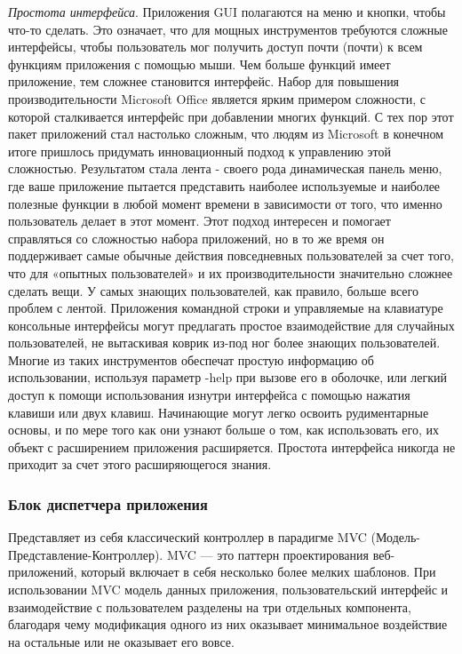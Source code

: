\textit{Простота интерфейса}. Приложения GUI полагаются на меню и кнопки, чтобы что-то сделать. Это означает, что для мощных инструментов требуются сложные интерфейсы, чтобы пользователь мог получить доступ почти (почти) к всем функциям приложения с помощью мыши. Чем больше функций имеет приложение, тем сложнее становится интерфейс. Набор для повышения производительности Microsoft Office является ярким примером сложности, с которой сталкивается интерфейс при добавлении многих функций. С тех пор этот пакет приложений стал настолько сложным, что людям из Microsoft в конечном итоге пришлось придумать инновационный подход к управлению этой сложностью. Результатом стала лента - своего рода динамическая панель меню, где ваше приложение пытается представить наиболее используемые и наиболее полезные функции в любой момент времени в зависимости от того, что именно пользователь делает в этот момент. Этот подход интересен и помогает справляться со сложностью набора приложений, но в то же время он поддерживает самые обычные действия повседневных пользователей за счет того, что для «опытных пользователей» и их производительности значительно сложнее сделать вещи. У самых знающих пользователей, как правило, больше всего проблем с лентой. Приложения командной строки и управляемые на клавиатуре консольные интерфейсы могут предлагать простое взаимодействие для случайных пользователей, не вытаскивая коврик из-под ног более знающих пользователей. Многие из таких инструментов обеспечат простую информацию об использовании, используя параметр -help при вызове его в оболочке, или легкий доступ к помощи использования изнутри интерфейса с помощью нажатия клавиши или двух клавиш. Начинающие могут легко освоить рудиментарные основы, и по мере того как они узнают больше о том, как использовать его, их объект с расширением приложения расширяется. Простота интерфейса никогда не приходит за счет этого расширяющегося знания.


\subsubsection{Блок диспетчера приложения }

Представляет из себя классический контроллер в парадигме MVC (Модель-Представление-Контроллер).  MVC — это паттерн проектирования веб-приложений, который включает в себя несколько более мелких шаблонов. При использовании MVC модель данных приложения, пользовательский интерфейс и взаимодействие с пользователем разделены на три отдельных компонента, благодаря чему модификация одного из них оказывает минимальное воздействие на остальные или не оказывает его вовсе.

